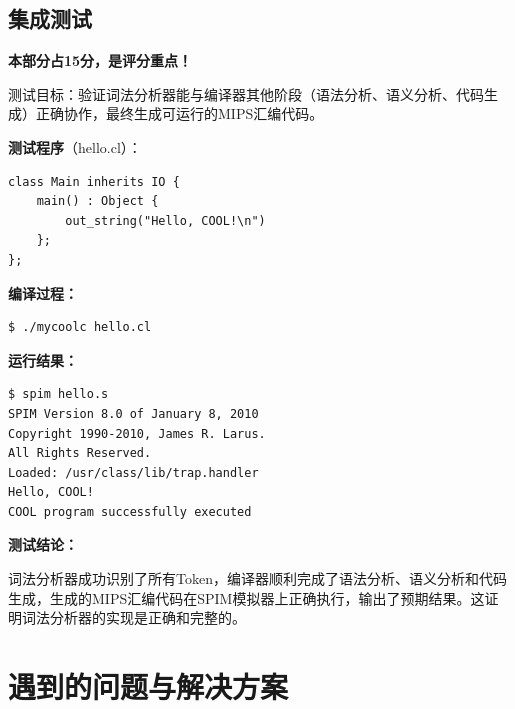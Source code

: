 \documentclass[twocolumn]{article}
\begin{document}

\subsection{集成测试}

\textbf{本部分占15分，是评分重点！}

测试目标：验证词法分析器能与编译器其他阶段（语法分析、语义分析、代码生成）正确协作，最终生成可运行的MIPS汇编代码。

\textcolor{red}{%
}

\textbf{测试程序}（hello.cl）：
\begin{lstlisting}[language=cool, caption={集成测试程序}]
class Main inherits IO {
    main() : Object {
        out_string("Hello, COOL!\n")
    };
};
\end{lstlisting}

\textbf{编译过程：}
\begin{verbatim}
$ ./mycoolc hello.cl
\end{verbatim}

\textcolor{red}{%
}

\textbf{运行结果：}
\begin{verbatim}
$ spim hello.s
SPIM Version 8.0 of January 8, 2010
Copyright 1990-2010, James R. Larus.
All Rights Reserved.
Loaded: /usr/class/lib/trap.handler
Hello, COOL!
COOL program successfully executed
\end{verbatim}

\textbf{测试结论：}
\textcolor{red}{%
}

词法分析器成功识别了所有Token，编译器顺利完成了语法分析、语义分析和代码生成，生成的MIPS汇编代码在SPIM模拟器上正确执行，输出了预期结果。这证明词法分析器的实现是正确和完整的。

\section{遇到的问题与解决方案}
\textcolor{red}{%
}
\end{document}
